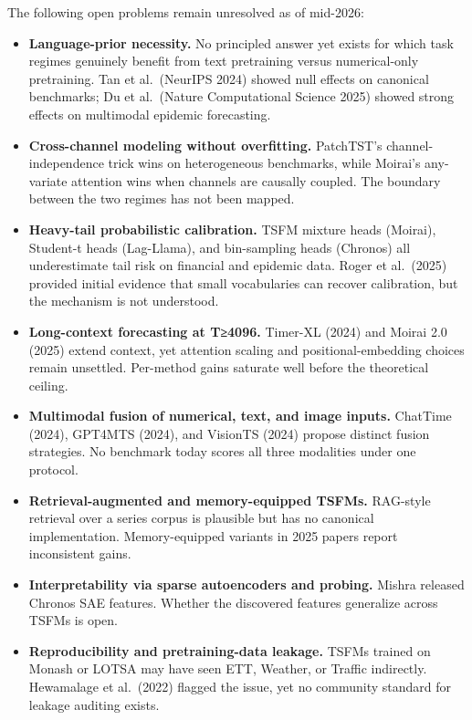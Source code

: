 \documentclass{article}
\begin{document}
The following open problems remain unresolved as of mid-2026:

\begin{itemize}

\item
  \textbf{Language-prior necessity.} No principled answer yet exists for which task regimes genuinely benefit from text pretraining versus numerical-only pretraining. Tan et al.~(NeurIPS 2024) showed null effects on canonical benchmarks; Du et al.~(Nature Computational Science 2025) showed strong effects on multimodal epidemic forecasting.
\item
  \textbf{Cross-channel modeling without overfitting.} PatchTST's channel-independence trick wins on heterogeneous benchmarks, while Moirai's any-variate attention wins when channels are causally coupled. The boundary between the two regimes has not been mapped.
\item
  \textbf{Heavy-tail probabilistic calibration.} TSFM mixture heads (Moirai), Student-t heads (Lag-Llama), and bin-sampling heads (Chronos) all underestimate tail risk on financial and epidemic data. Roger et al.~(2025) provided initial evidence that small vocabularies can recover calibration, but the mechanism is not understood.
\item
  \textbf{Long-context forecasting at T≥4096.} Timer-XL (2024) and Moirai 2.0 (2025) extend context, yet attention scaling and positional-embedding choices remain unsettled. Per-method gains saturate well before the theoretical ceiling.
\item
  \textbf{Multimodal fusion of numerical, text, and image inputs.} ChatTime (2024), GPT4MTS (2024), and VisionTS (2024) propose distinct fusion strategies. No benchmark today scores all three modalities under one protocol.
\item
  \textbf{Retrieval-augmented and memory-equipped TSFMs.} RAG-style retrieval over a series corpus is plausible but has no canonical implementation. Memory-equipped variants in 2025 papers report inconsistent gains.
\item
  \textbf{Interpretability via sparse autoencoders and probing.} Mishra \citet{mishra2026dissectingchronoss} released Chronos SAE features. Whether the discovered features generalize across TSFMs is open.
\item
  \textbf{Reproducibility and pretraining-data leakage.} TSFMs trained on Monash or LOTSA may have seen ETT, Weather, or Traffic indirectly. Hewamalage et al.~(2022) flagged the issue, yet no community standard for leakage auditing exists.
\end{itemize}
\end{document}
